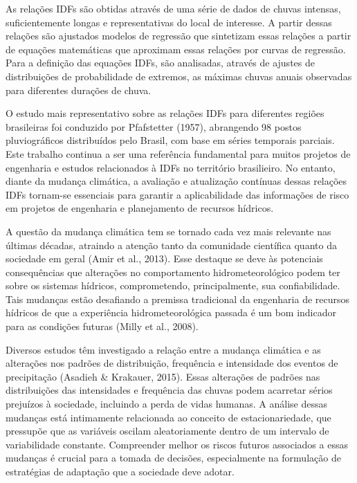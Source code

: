 \documentclass[
]{agujournal2019}
\begin{document}
As relações IDFs são obtidas através de uma série de dados de chuvas
intensas, suficientemente longas e representativas do local de
interesse. A partir dessas relações são ajustados modelos de regressão
que sintetizam essas relações a partir de equações matemáticas que
aproximam essas relações por curvas de regressão. Para a definição das
equações IDFs, são analisadas, através de ajustes de distribuições de
probabilidade de extremos, as máximas chuvas anuais observadas para
diferentes durações de chuva.

O estudo mais representativo sobre as relações IDFs para diferentes
regiões brasileiras foi conduzido por Pfafstetter (1957), abrangendo 98
postos pluviográficos distribuídos pelo Brasil, com base em séries
temporais parciais. Este trabalho continua a ser uma referência
fundamental para muitos projetos de engenharia e estudos relacionados à
IDFs no território brasilieiro. No entanto, diante da mudança climática,
a avaliação e atualização contínuas dessas relações IDFs tornam-se
essenciais para garantir a aplicabilidade das informações de risco em
projetos de engenharia e planejamento de recursos hídricos.

A questão da mudança climática tem se tornado cada vez mais relevante
nas últimas décadas, atraindo a atenção tanto da comunidade científica
quanto da sociedade em geral (Amir et al., 2013). Esse destaque se deve
às potenciais consequências que alterações no comportamento
hidrometeorológico podem ter sobre os sistemas hídricos, comprometendo,
principalmente, sua confiabilidade. Tais mudanças estão desafiando a
premissa tradicional da engenharia de recursos hídricos de que a
experiência hidrometeorológica passada é um bom indicador para as
condições futuras (Milly et al., 2008).

Diversos estudos têm investigado a relação entre a mudança climática e
as alterações nos padrões de distribuição, frequência e intensidade dos
eventos de precipitação (Asadieh \& Krakauer, 2015). Essas alterações de
padrões nas distribuições das intensidades e frequência das chuvas podem
acarretar sérios prejuízos à sociedade, incluindo a perda de vidas
humanas. A análise dessas mudanças está intimamente relacionada ao
conceito de estacionariedade, que pressupõe que as variáveis oscilam
aleatoriamente dentro de um intervalo de variabilidade constante.
Compreender melhor os riscos futuros associados a essas mudanças é
crucial para a tomada de decisões, especialmente na formulação de
estratégias de adaptação que a sociedade deve adotar.
\end{document}
